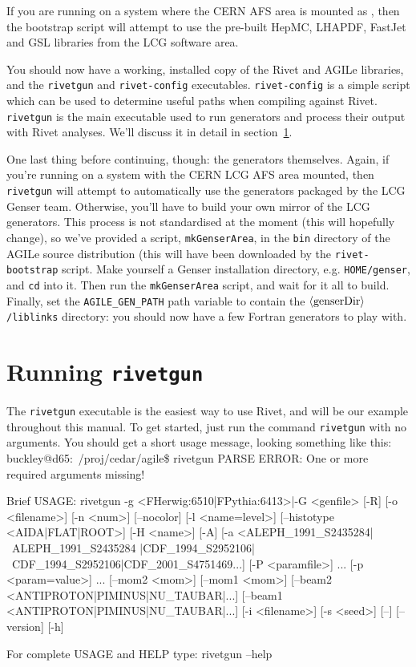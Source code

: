 \documentclass{JHEP3}
\newenvironment{snippet}{\Verbatim}{\endVerbatim}
\newcommand{\kbd}[1]{\texttt{#1}\xspace}
\newcommand{\inp}[1]{\textsf{\textdollar}\hspace{1mm}\texttt{#1}\xspace}
\newcommand{\var}[1]{\texttt{\textdollar{}#1}\xspace}
\newcommand{\val}[1]{\textit{\ensuremath{\langle\text{\textrm{#1}\/}\rangle}}\xspace}
\newcommand{\SectionRef}[1]{section~\ref{#1}}
\begin{document}
If you are running on a system where the CERN AFS area is mounted as
, then the bootstrap script will attempt to use the
pre-built HepMC, LHAPDF, FastJet and GSL libraries from the LCG software area.

You should now have a working, installed copy of the Rivet and AGILe libraries,
and the \kbd{rivetgun} and \kbd{rivet-config} executables. \kbd{rivet-config} is
a simple script which can be used to determine useful paths when compiling
against Rivet. \kbd{rivetgun} is the main executable used to run generators and
process their output with Rivet analyses. We'll discuss it in detail
in \SectionRef{sec:rivetgun}.

One last thing before continuing, though: the generators themselves. Again, if
you're running on a system with the CERN LCG AFS area mounted, then
\kbd{rivetgun} will attempt to automatically use the generators packaged by the
LCG Genser team. Otherwise, you'll have to build your own mirror of the LCG
generators. This process is not standardised at the moment (this will hopefully
change), so we've provided a script, \kbd{mkGenserArea}, in the \kbd{bin}
directory of the AGILe source distribution (this will have been downloaded by
the \kbd{rivet-bootstrap} script. Make yourself a Genser installation directory,
e.g. \kbd{\var{HOME}/genser}, and \kbd{cd} into it. Then run the
\kbd{mkGenserArea} script, and wait for it all to build. Finally, set the
\var{AGILE_GEN_PATH} path variable to contain the \kbd{\val{genserDir}/liblinks}
directory: you should now have a few Fortran generators to play with.


\section{Running \kbd{rivetgun}}
\label{sec:rivetgun}
The \kbd{rivetgun} executable is the easiest way to use Rivet, and will be our
example throughout this manual. To get started, just run the command
\inp{rivetgun} with no arguments. You should get a short usage message, looking
something like this:
%
\begin{snippet}
buckley@d65:~/proj/cedar/agile\$ rivetgun
PARSE ERROR:  
             One or more required arguments missing!

Brief USAGE: 
   rivetgun  {-g <FHerwig:6510|FPythia:6413>|-G <genfile>} [-R] 
             [-o <filename>] [-n <num>] [--nocolor] [-l <name=level>] 
             [--histotype <AIDA|FLAT|ROOT>] [-H <name>]
             [-A] [-a <ALEPH_1991_S2435284|~ALEPH_1991_S2435284
             |CDF_1994_S2952106|~CDF_1994_S2952106|CDF_2001_S4751469...]
             [-P <paramfile>] ...  [-p <param=value>] ...  [--mom2 <mom>]
             [--mom1 <mom>] [--beam2 <ANTIPROTON|PIMINUS|NU_TAUBAR|...]
             [--beam1 <ANTIPROTON|PIMINUS|NU_TAUBAR|...]
             [-i <filename>] [-s <seed>] [--] [--version] [-h]

For complete USAGE and HELP type: 
   rivetgun --help
\end{snippet}
\end{document}
